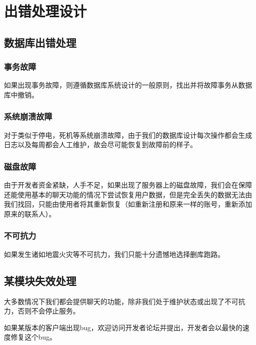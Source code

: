 \chapter{出错处理设计}
\section{数据库出错处理}
\subsection{事务故障}
如果出现事务故障，则遵循数据库系统设计的一般原则，找出并将故障事务从数据库中撤销。
\subsection{系统崩溃故障}
对于类似于停电，死机等系统崩溃故障，由于我们的数据库设计每次操作都会生成日志以及每周都会人工维护，故会尽可能恢复到故障前的样子。
\subsection{磁盘故障}
由于开发者资金紧缺，人手不足，如果出现了服务器上的磁盘故障，我们会在保障还能使用基本的聊天功能的情况下尝试恢复用户数据，但是完全丢失的数据无法由我们找回，只能由使用者将其重新恢复（如重新注册和原来一样的账号，重新添加原来的联系人）。
\subsection{不可抗力}
如果发生诸如地震火灾等不可抗力，我们只能十分遗憾地选择删库跑路。

\section{某模块失效处理}
大多数情况下我们都会提供聊天的功能，除非我们处于维护状态或出现了不可抗力，否则不会停止服务。

如果某版本的客户端出现bug，欢迎访问开发者论坛并提出，开发者会以最快的速度修复这个bug。

